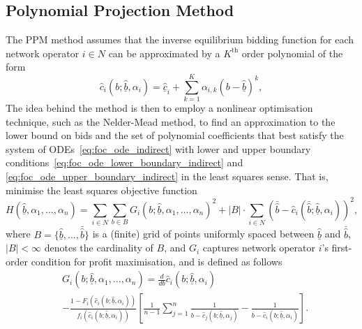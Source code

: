\subsection{Polynomial Projection Method} %
\label{sub:polynomial_projection_method_indirect}
The PPM method assumes that the inverse equilibrium bidding function for each network operator $i\in N$ can be approximated by a $K^{\textrm{th}}$ order polynomial of the form
\begin{equation}
  \label{eq:polynomial_cost_function_indirect}
  \hat{c}_i(b;\underline{\hat{b}}, \alpha_i) = \underline{\hat{c}}_i + \sum_{k=1}^K \alpha_{i,k}(b - \underline{\hat{b}})^k,
\end{equation}
 The idea behind the method is then to employ a nonlinear optimisation technique, such as the Nelder-Mead method, to find an approximation to the lower bound on bids and the set of polynomial coefficients that best satisfy the system of ODEs~\eqref{eq:foc_ode_indirect} with lower and upper boundary conditions~\eqref{eq:foc_ode_lower_boundary_indirect} and \eqref{eq:foc_ode_upper_boundary_indirect} in the least squares sense. That is, minimise the least squares objective function
\begin{equation}
  \label{eq:least_squares_objective_function_indirect}
  H(\underline{\hat{b}}, \alpha_1,\dotsc,\alpha_n) = \sum_{i\in N}\sum_{b\in B}G_i(b; \underline{\hat{b}}, \alpha_1,\dotsc, \alpha_n)^2 + |B|\cdot\sum_{i\in N} (\bar{\hat{b}} - \hat{c}_i(\bar{\hat{b}}; \underline{\hat{b}}, \alpha_i))^2,
\end{equation}
where $B=\{\underline{\hat{b}},\dotsc,\bar{\hat{b}}\}$ is a (finite) grid of points uniformly spaced between $\underline{\hat{b}}$ and $\bar{\hat{b}}$, $|B| < \infty$ denotes the cardinality of $B$, and $G_i$ captures network operator $i$'s first-order condition for profit maximisation, and is defined as follows
\begin{align}
  &G_i(b; \underline{\hat{b}}, \alpha_1, \dotsc, \alpha_n) = \displaystyle\frac{d}{db}\hat{c}_i(b;\underline{\hat{b}}, \alpha_i)\\\nonumber
  &- \displaystyle\frac{1 - F_i(\hat{c}_i(b;\underline{\hat{b}}, \alpha_i))}{f_i(\hat{c}_i(b;\underline{\hat{b}}, \alpha_i))}\left[ \frac{1}{n-1}\sum_{j=1}^n\frac{1}{b - \hat{c}_j(b;\underline{\hat{b}}, \alpha_j)} - \frac{1}{b - \hat{c}_i(b;\underline{\hat{b}}, \alpha_i)} \right].
\end{align}
